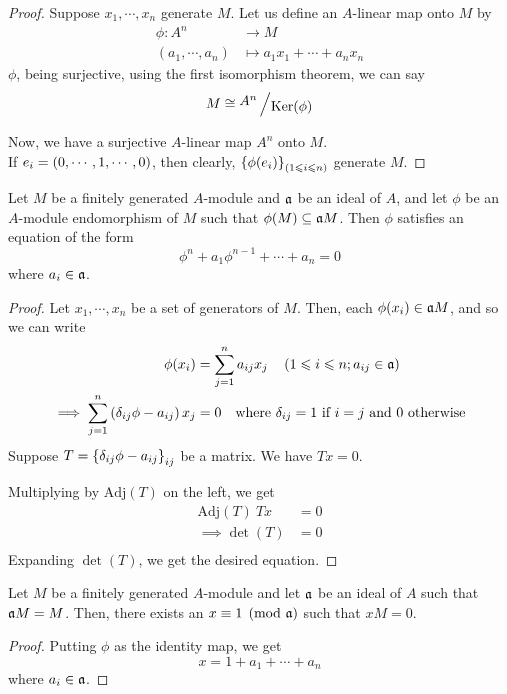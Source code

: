 \begin{proof} \brak{\implies}
	Suppose \(x_1, \cdots, x_n\) generate \(M\).
	Let us define an \(A\)-linear map onto \(M\) by
	\begin{align*}
		\phi \colon A^n &\to M \\
		(a_1, \cdots, a_n) &\mapsto a_1 x_1 + \cdots + a_n x_n
	\end{align*}
	\(\phi\), being surjective, using the first isomorphism theorem, we
	can say
	\[
		M \cong \bigslant{A^n}{\Ker(\phi)}
	\]

	\brak{\Longleftarrow}
	Now, we have a surjective \(A\)-linear map \(A^n\) onto \(M\). \\
	If \(e_i = \left( 0, \cdots, 1, \cdots, 0 \right)\), then clearly,
	\(\left\{ \phi(e_i) \right\}_{\left( 1 \leqslant i \leqslant n \right)}\) generate \(M\).
\end{proof}


\begin{proposition}{}{}
	Let \(M\) be a finitely generated \(A\)-module and \(\mathfrak{a}\) be an ideal
	of \(A\), and let \(\phi\) be an \(A\)-module endomorphism of \(M\)
	such that \(\phi(M) \subseteq \mathfrak{a} M\).
	Then \(\phi\) satisfies an equation of the form
	\[
		\phi^n + a_1 \phi^{n-1} + \cdots + a_n = 0
	\]
	where \(a_i \in \mathfrak{a}\).
\end{proposition}

\begin{proof}
	Let \(x_1, \cdots, x_n\) be a set of generators of \(M\).
	Then, each \(\phi(x_i) \in \mathfrak{a} M\), and so we can write
	\begin{align*}
		\phi(x_i) &= \sum_{j=1}^n a_{ij} x_j \quad
		\left( 1 \leqslant i \leqslant n ; a_{ij} \in \mathfrak{a} \right) \\
		\implies \sum_{j=1}^n \left( \delta_{ij}\phi - a_{ij} \right) x_j &= 0
		\quad \text{where } \delta_{ij} = 1 \text{ if } i = j \text{ and }
		0 \text{ otherwise}
	\end{align*}
	Suppose \(T = \left\{ \delta_{ij}\phi - a_{ij} \right\}_{ij}\) be a matrix.
	We have \(Tx = 0\).

	Multiplying by \(\text{Adj}(T)\) on the left, we get
	\begin{align*}
		\text{Adj}(T) \ T x &= 0 \\
		\implies \det(T) &= 0 \\
	\end{align*}
	Expanding \(\det(T)\), we get the desired equation.
\end{proof}


\begin{corollary}{}{}
	Let \(M\) be a finitely generated \(A\)-module and let \(\mathfrak{a}\) be
	an ideal of \(A\) such that \(\mathfrak{a} M = M\).
	Then, there exists an \(x \equiv 1 \pmod{\mathfrak{a}}\) such that
	\(xM = 0\).
\end{corollary}
\begin{proof}
	Putting \(\phi\) as the identity map, we get
	\[
		x = 1 + a_1 + \cdots + a_n
	\]
	where \(a_i \in \mathfrak{a}\).
\end{proof}


